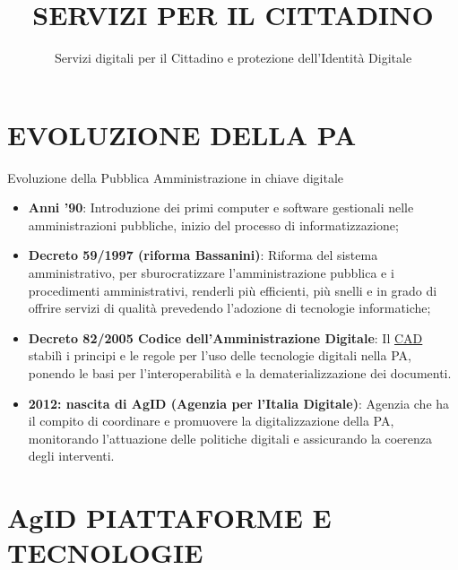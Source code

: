 \documentclass[aspectratio=1610]{beamer}
\title{SERVIZI PER IL CITTADINO}
\subtitle{Servizi digitali per il Cittadino e protezione dell’Identità Digitale}
\date{}
\institute{\textit{
        Fonti:
        \begin{itemize}
            \item[-] \href{https://digitalepopolare.it/breve-storia-della-digitalizzazione-della-pubblica-amministrazione}{Digitale Popolare}
            \item[-] \href{https://www.luisatreccani.it/legge-bassanini/}{Luisa Treccani, esperta in materia di legislazione e normativa scolastica}
        \end{itemize}
    }
}
\begin{document}
\begin{frame}
    \titlepage
\end{frame}

\section{EVOLUZIONE DELLA PA}

\begin{frame}{Evoluzione della Pubblica Amministrazione in chiave digitale}
    \begin{itemize}
        \item \textbf{Anni '90}: Introduzione dei primi computer e software gestionali nelle amministrazioni 
        pubbliche, inizio del processo di informatizzazione;
        \pause
        \item \textbf{Decreto 59/1997 (riforma Bassanini)}: Riforma del sistema amministrativo, per sburocratizzare 
        l’amministrazione pubblica e i procedimenti amministrativi, renderli più efficienti, più snelli e in grado di offrire 
        servizi di qualità prevedendo l’adozione di tecnologie informatiche;
        \pause
        \item \textbf{Decreto 82/2005 Codice dell'Amministrazione Digitale}: Il \href{https://www.agid.gov.it/it/agenzia/strategia-quadro-normativo/codice-amministrazione-digitale}{CAD} 
        stabilì i principi e le regole per l’uso delle tecnologie digitali nella PA, ponendo le basi per 
        l’interoperabilità e la dematerializzazione dei documenti.
        \pause
        \item \textbf{2012: nascita di AgID (Agenzia per l'Italia Digitale)}: Agenzia che ha il compito di coordinare e 
        promuovere la digitalizzazione della PA, monitorando l’attuazione delle politiche digitali e assicurando 
        la coerenza degli interventi.
    \end{itemize}
\end{frame}

\section{AgID PIATTAFORME E TECNOLOGIE}
\end{document}
